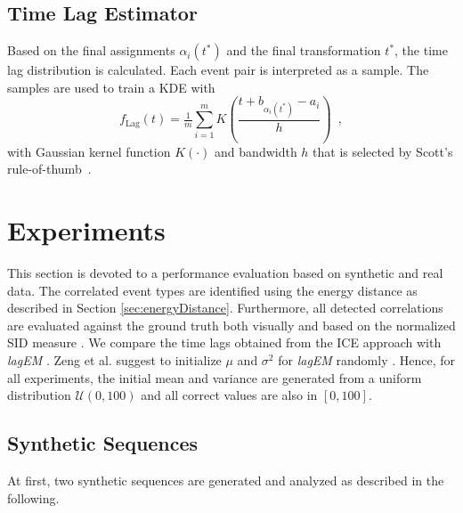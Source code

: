 \documentclass[conference]{IEEEtran}
\theoremstyle{examplestyle}
\begin{document}
\subsection{Time Lag Estimator} \label{sec:labestimator}
Based on the final assignments $\alpha_i(t^*)$ and the final transformation $t^*$, the time lag distribution is calculated. Each event pair is interpreted as a sample. The samples are used to train a \ac{KDE} with
\begin{equation}
	\label{eq:solutionICP}
 f_{\text{Lag}}(t) = \tfrac{1}{m} \sum_{i=1}^m K\left( \frac{t+ b_{\alpha_i(t^*)} - a_i }{ h} \right) \enspace ,
	\end{equation}
with Gaussian kernel function $K(\cdot)$ and bandwidth $h$ that is selected by Scott's rule-of-thumb~\cite{Scott1992}.











\section{Experiments} \label{sec:exp}

This section is devoted to a performance evaluation based on synthetic and real data.
The correlated event types are identified using the energy distance as described in Section \ref{sec:energyDistance}.
Furthermore, all detected correlations are evaluated against the ground truth both visually and based on the normalized \ac{SID} measure \cite{Hanebeck2003}.
We compare the time lags obtained from the \ac{ICE} approach with \textit{lagEM} \cite{Zeng2015}. %
Zeng et al. suggest to initialize \(\mu\) and \(\sigma^2\) for \textit{lagEM} randomly \cite{Zeng2015}. Hence, for all experiments, the initial mean and variance are generated from a uniform distribution \(\mathcal{U}(0, 100)\) and all correct values are also in \([0, 100]\).





\subsection{Synthetic Sequences}
At first, two synthetic sequences are generated and analyzed as described in the following.
\end{document}
